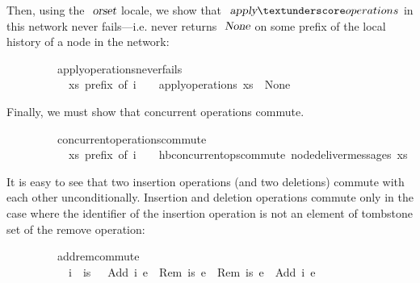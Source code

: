 \noindent Then, using the $\isa{orset}$ locale, we show that
$\isa{apply}{\isacharunderscore}operations$ in this network never fails---i.e.
never returns $\isa{None}$ on some prefix of the local history of a node in the
network:
\vspace{0.35em}
\begin{isabellebody}
\ \ \ \ \ \ \ \ \ apply{\isacharunderscore}operations{\isacharunderscore}never{\isacharunderscore}fails{\isacharcolon}\isanewline
\ \ \ \ \ \ \ \ \ \ \ {\isachardoublequoteopen}xs\ prefix\ of\ i{\isachardoublequoteclose}\ \ \ \ {\isachardoublequoteopen}apply{\isacharunderscore}operations\ xs\ {\isasymnoteq}\ None{\isachardoublequoteclose}
\end{isabellebody}
\vspace{0.35em}
\noindent Finally, we must show that concurrent operations commute.
\vspace{0.35em}
\begin{isabellebody}
\ \ \ \ \ \ \ \ \ concurrent{\isacharunderscore}operations{\isacharunderscore}commute{\isacharcolon}\isanewline
\ \ \ \ \ \ \ \ \ \ \ {\isachardoublequoteopen}xs\ prefix\ of\ i{\isachardoublequoteclose}\ \ \ \ {\isachardoublequoteopen}hb{\isachardot}concurrent{\isacharunderscore}ops{\isacharunderscore}commute\ {\isacharparenleft}node{\isacharunderscore}deliver{\isacharunderscore}messages\ xs{\isacharparenright}{\isachardoublequoteclose}
\end{isabellebody}
\vspace{0.35em}
\noindent It is easy to see that two insertion operations (and two deletions)
commute with each other unconditionally. Insertion and deletion operations
commute only in the case where the identifier of the insertion operation is not
an element of tombstone set of the remove operation:
\vspace{0.35em}
\begin{isabellebody}
\ \ \ \ \ \ \ \ \ add{\isacharunderscore}rem{\isacharunderscore}commute{\isacharcolon}\isanewline
\ \ \ \ \ \ \ \ \ \ \ {\isachardoublequoteopen}i\ {\isasymnotin}\ is{\isachardoublequoteclose}\ \ \ {\isachardoublequoteopen}{\isasymlangle}Add\ i\ e{}{\isasymrangle}\ {\isasymrhd}\ {\isasymlangle}Rem\ is\ e{}{\isasymrangle}\ {\isacharequal}\ {\isasymlangle}Rem\ is\ e{}{\isasymrangle}\ {\isasymrhd}\ {\isasymlangle}Add\ i\ e{}{\isasymrangle}{\isachardoublequoteclose}
\end{isabellebody}
\vspace{0.35em}

